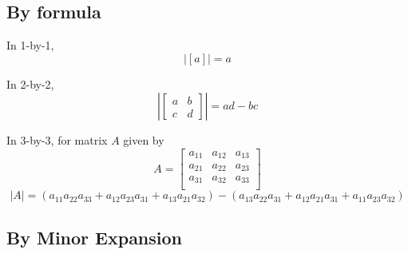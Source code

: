 \subsection{By formula}
\begin{framed}
  


   In 1-by-1, \[
      \left| [a] \right|  = a
   \] 
  
   In 2-by-2, \[
      \left| \begin{bmatrix} a & b \\ c& d \end{bmatrix}  \right|  = ad - bc
   \] 

   In 3-by-3, for matrix $A$ given by \[
     A = \begin{bmatrix} 
        a_{11} & a_{12} & a_{13}   \\
        a_{21} & a_{22} & a_{23}   \\
        a_{31} & a_{32} & a_{33}   \\
     \end{bmatrix}
   \] 
   \[
   \left| A \right| = \left( 
     a_{11} a_{22} a_{33} +  
     a_{12} a_{23} a_{31} +  
     a_{13} a_{21} a_{32}
  \right)  - \left( 
     a_{13}a_{22}a_{31} + 
     a_{12}a_{21}a_{31} +
     a_{11}a_{23}a_{32}
  \right) 
   \] 
\end{framed}

\subsection{By Minor Expansion}

